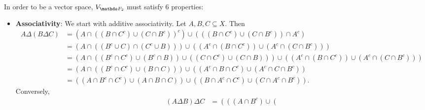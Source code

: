 \documentclass{homework}
\begin{document}
\begin{solution}
  In order to be a vector space, $V_{\F_2}$ must satisfy 6 properties:
  \begin{itemize}
    \item \textbf{Associativity}: We start with additive associativity. Let $A,B,C\subseteq X$. Then 
      \begin{align*}
        A\Delta\left( B\Delta C \right) &= \left( A\cap \left( \left( B\cap C^{c} \right) \cup
        \left( C\cap B^{c} \right)  \right) ^{c} \right)\cup \left( \left( \left( B\cap C^{c} \right)
    \cup \left( C\cap B^{c} \right) \right)\cap  A^{c}\right)  \\
                                        &= \left( A\cap \left( \left( B^{c}\cup C \right) \cap
                                            \left( C^{c}\cup B \right)  \right)  \right)\cup
                                            \left(
                                      \left( A^{c}\cap \left( B\cap C^{c} \right)  \right) \cup
                                    \left( A^{c}\cap \left( C\cap B^{c} \right)  \right) \right)   \\
                                        &= \left( A\cap \left( \left( B^{c}\cap C^{c} \right)\cup
                                        \left( B^{c}\cap B \right) \right) \cup \left( \left(
                                    C\cap C^{c}\right) \cup \left( C\cap B \right)  \right)  \right)
                                    \cup \left( \left( A^{c}\cap \left( B\cap C^{c} \right)  \right)
                                    \cup \left( A^{c}\cap \left( C\cap B^{c} \right)  \right)
                                  \right) \\
                                        &= \left( A\cap \left( \left( B^{c}\cap C^{c} \right)\cup
                                        \left( B\cap C \right)   \right)  \right)  \cup \left(
                                      \left(  A^{c}\cap B\cap C^{c} \right) \cup \left( A^{c}\cap
                                    C\cap B^{c} \right) \right) \\
                                        &= \left( \left( A\cap B^{c}\cap C^{c} \right)\cup \left(
                                        A\cap B\cap C \right)   \right)\cup \left( \left( 
                                    B\cap A^{c}\cap C^{c} \right) \cup \left( C\cap A^{c}\cap B^{c} \right) \right) 
      .\end{align*} Conversely, 
      \begin{align*}
        \left( A\Delta B \right) \Delta C&= \left( \left( \left( A\cap B^{c} \right) \cup \left(

\end{align*}
\end{itemize}
\end{solution}
\end{document}
